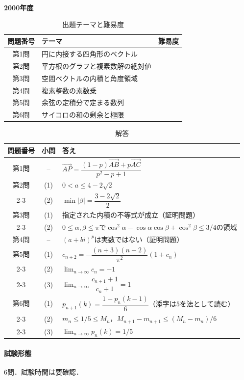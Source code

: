 \documentclass[../../main.tex]{subfiles}
\begin{document}
\begin{center}
  {\fontsize{48pt}{58pt}\selectfont \textbf{2000}\normalsize\textbf{年度}}
\end{center}

\begin{table}[htb]
  \centering
  \caption{出題テーマと難易度}
  \begin{tabular}{|c|p{9cm}|c|}
    \hline
    \textbf{問題番号} & \textbf{テーマ} & \textbf{難易度} \\
    \hline
    第1問 & 円に内接する四角形のベクトル & \\
    \hline
    第2問 & 平方根のグラフと複素数解の絶対値 & \\
    \hline
    第3問 & 空間ベクトルの内積と角度領域 & \\
    \hline
    第4問 & 複素整数の素数乗 & \\
    \hline
    第5問 & 余弦の定積分で定まる数列 & \\
    \hline
    第6問 & サイコロの和の剰余と極限 & \\
    \hline
  \end{tabular}
\end{table}

\begin{table}[htb]
  \centering
  \caption{解答}
  \renewcommand{\arraystretch}{1.4}
  \begin{tabular}{|c|c|p{9cm}|}
    \hline
    \textbf{問題番号} & \textbf{小問} & \textbf{答え} \\
    \hline
    第1問 & -- & $\overrightarrow{AP}=\dfrac{(1-p)\overrightarrow{AB}+p\overrightarrow{AC}}{p^2-p+1}$ \\
    \hline
    第2問 & (1) & $0<a\le4-2\sqrt{2}$ \\
    \cline{2-3}
    & (2) & $\min|\beta|=\dfrac{3-2\sqrt{2}}{2}$ \\
    \hline
    第3問 & (1) & 指定された内積の不等式が成立（証明問題） \\
    \cline{2-3}
    & (2) & $0\le\alpha,\beta\le\pi$で$\cos^2\alpha-\cos\alpha\cos\beta+\cos^2\beta\le3/4$の領域 \\
    \hline
    第4問 & -- & $(a+bi)^p$は実数ではない（証明問題） \\
    \hline
    第5問 & (1) & $c_{n+2}=-\dfrac{(n+3)(n+2)}{\pi^2}(1+c_n)$ \\
    \cline{2-3}
    & (2) & $\lim_{n\to\infty}c_n=-1$ \\
    \cline{2-3}
    & (3) & $\lim_{n\to\infty}\dfrac{c_{n+1}+1}{c_n+1}=1$ \\
    \hline
    第6問 & (1) & $p_{n+1}(k)=\dfrac{1+p_n(k-1)}{6}$（添字は$5$を法として読む） \\
    \cline{2-3}
    & (2) & $m_n\le1/5\le M_n$，$M_{n+1}-m_{n+1}\le(M_n-m_n)/6$ \\
    \cline{2-3}
    & (3) & $\lim_{n\to\infty}p_n(k)=1/5$ \\
    \hline
  \end{tabular}
\end{table}

\paragraph{試験形態}
6問．試験時間は要確認．
\end{document}
